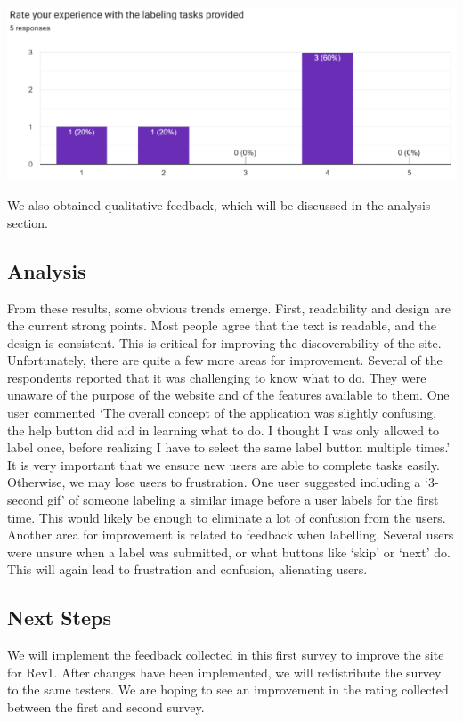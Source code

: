 \documentclass[12pt, titlepage]{article}
\begin{document}
\begin{centering}
\includegraphics[scale=0.7]{chart (1).png}\\
\end{centering}
We also obtained qualitative feedback, which will be discussed in the analysis section.
\subsection{Analysis}
From these results, some obvious trends emerge. First, readability and design are the current strong points. Most people agree that the text is readable, and the design is consistent. This is critical for improving the discoverability of the site.
Unfortunately, there are quite a few more areas for improvement. Several of the respondents reported that it was challenging to know what to do. They were unaware of the purpose of the website and of the features available to them. One user commented `The overall concept of the application was slightly confusing, the help button did aid in learning what to do. I thought I was only allowed to label once, before realizing I have to select the same label button multiple times.'
It is very important that we ensure new users are able to complete tasks easily. Otherwise, we may lose users to frustration. One user suggested including a `3-second gif' of someone labeling a similar image before a user labels for the first time. This would likely be enough to eliminate a lot of confusion from the users. Another area for improvement is related to feedback when labelling. Several users were unsure when a label was submitted, or what buttons like `skip' or `next' do. 
This will again lead to frustration and confusion, alienating users. 

\subsection{Next Steps}
We will implement the feedback collected in this first survey to improve the site for Rev1. After changes have been implemented, we will redistribute the survey to the same testers. We are hoping to see an improvement in the rating collected between the first and second survey.
\end{document}
